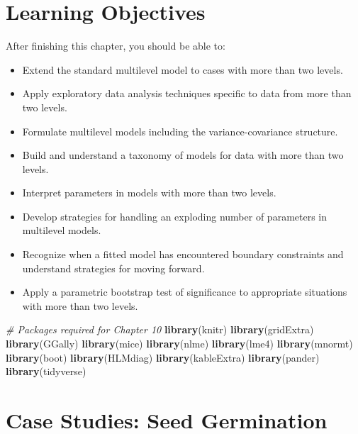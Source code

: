 \documentclass[
]{krantz}
\newenvironment{Shaded}{\begin{snugshade}}{\end{snugshade}}
\newcommand{\CommentTok}[1]{\textcolor[rgb]{0.37,0.37,0.37}{\textit{#1}}}
\newcommand{\KeywordTok}[1]{\textcolor[rgb]{0.27,0.27,0.27}{\textbf{#1}}}
\newcommand{\NormalTok}[1]{#1}
\providecommand{\tightlist}{%
  \setlength{\itemsep}{0pt}\setlength{\parskip}{0pt}}
\begin{document}
\hypertarget{learning-objectives-9}{%
\section{Learning Objectives}\label{learning-objectives-9}}

After finishing this chapter, you should be able to:

\begin{itemize}
\tightlist
\item
  Extend the standard multilevel model to cases with more than two levels.
\item
  Apply exploratory data analysis techniques specific to data from more than two levels.
\item
  Formulate multilevel models including the variance-covariance structure.
\item
  Build and understand a taxonomy of models for data with more than two levels.
\item
  Interpret parameters in models with more than two levels.
\item
  Develop strategies for handling an exploding number of parameters in multilevel models.
\item
  Recognize when a fitted model has encountered boundary constraints and understand strategies for moving forward.
\item
  Apply a parametric bootstrap test of significance to appropriate situations with more than two levels.
\end{itemize}

\begin{Shaded}
\begin{Highlighting}[]
\CommentTok{# Packages required for Chapter 10}
\KeywordTok{library}\NormalTok{(knitr)}
\KeywordTok{library}\NormalTok{(gridExtra)}
\KeywordTok{library}\NormalTok{(GGally)}
\KeywordTok{library}\NormalTok{(mice)}
\KeywordTok{library}\NormalTok{(nlme)}
\KeywordTok{library}\NormalTok{(lme4)}
\KeywordTok{library}\NormalTok{(mnormt)}
\KeywordTok{library}\NormalTok{(boot)}
\KeywordTok{library}\NormalTok{(HLMdiag)}
\KeywordTok{library}\NormalTok{(kableExtra)}
\KeywordTok{library}\NormalTok{(pander)}
\KeywordTok{library}\NormalTok{(tidyverse)}
\end{Highlighting}
\end{Shaded}

\hypertarget{cs:seeds}{%
\section{Case Studies: Seed Germination}\label{cs:seeds}}
\end{document}
